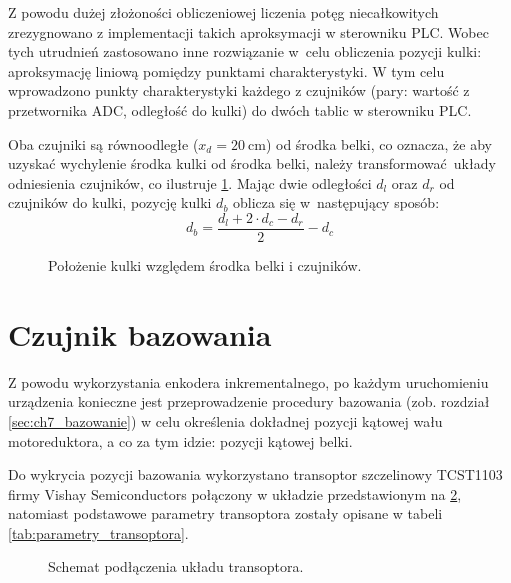 Z powodu dużej złożoności obliczeniowej liczenia potęg niecałkowitych zrezygnowano z implementacji takich aproksymacji w sterowniku PLC. Wobec tych utrudnień zastosowano inne rozwiązanie w~celu obliczenia pozycji kulki: aproksymację liniową pomiędzy punktami charakterystyki. W tym celu wprowadzono punkty charakterystyki każdego z czujników (pary: wartość z przetwornika ADC, odległość do kulki) do dwóch tablic w sterowniku PLC.

Oba czujniki są równoodległe ($x_d = \SI{20}{\centi\meter}$) od środka belki, co oznacza, że aby uzyskać wychylenie środka kulki od środka belki, należy transformować układy odniesienia czujników, co ilustruje \cref{fig:polozenie_kulki}. Mając dwie odległości $d_l$ oraz $d_r$ od czujników do kulki, pozycję kulki $d_b$ oblicza się w~następujący sposób:
\begin{equation}\label{eq:pozycja_kulki}
d_b = \frac{d_l + 2\cdot d_c - d_r}{2} - d_c
\end{equation}

\begin{figure}[H]
    \centering
    
    \caption{Położenie kulki względem środka belki i czujników.}
    \label{fig:polozenie_kulki}
\end{figure}


\section{Czujnik bazowania}
\label{sec:ch3_czujnik_bazowania}

Z powodu wykorzystania enkodera inkrementalnego, po każdym uruchomieniu urządzenia konieczne jest przeprowadzenie procedury bazowania (zob. rozdział \ref{sec:ch7_bazowanie}) w celu określenia dokładnej pozycji kątowej wału motoreduktora, a co za tym idzie: pozycji kątowej belki.

Do wykrycia pozycji bazowania wykorzystano transoptor szczelinowy TCST1103 firmy Vishay Semiconductors połączony w układzie przedstawionym na \cref{fig:uklad_transoptora}, natomiast podstawowe parametry transoptora zostały opisane w tabeli \ref{tab:parametry_transoptora}.

\begin{figure}[H]
    \centering
    
    \caption{Schemat podłączenia układu transoptora.}
    \label{fig:uklad_transoptora}
\end{figure}

